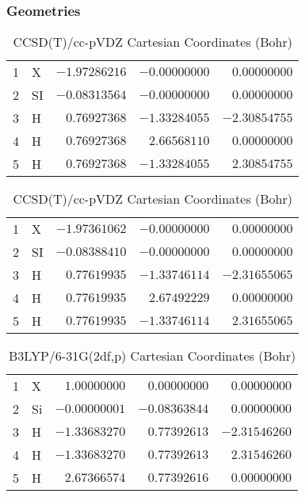 \documentclass[10pt,oneside]{article}
\begin{document}
\begin{table}[h!]
\subsubsection*{Geometries}
\begin{multicols}{2}
\centering
\caption{CCSD(T)/cc-pVTZ Cartesian Coordinates (Bohr)}
\begin{tabular}{llrrr}
\toprule
1  & X  & $-1.97286216$ & $-0.00000000$ & $ 0.00000000$ \\
2  & SI & $-0.08313564$ & $-0.00000000$ & $ 0.00000000$ \\
3  & H  & $ 0.76927368$ & $-1.33284055$ & $-2.30854755$ \\
4  & H  & $ 0.76927368$ & $ 2.66568110$ & $ 0.00000000$ \\
5  & H  & $ 0.76927368$ & $-1.33284055$ & $ 2.30854755$ \\
\bottomrule
\end{tabular}
\caption{CCSD(T)/cc-pVDZ Cartesian Coordinates (Bohr)}
\begin{tabular}{llrrr}
\toprule
1  & X  & $-1.97361062$ & $-0.00000000$ & $ 0.00000000$ \\
2  & SI & $-0.08388410$ & $-0.00000000$ & $ 0.00000000$ \\
3  & H  & $ 0.77619935$ & $-1.33746114$ & $-2.31655065$ \\
4  & H  & $ 0.77619935$ & $ 2.67492229$ & $ 0.00000000$ \\
5  & H  & $ 0.77619935$ & $-1.33746114$ & $ 2.31655065$ \\
\bottomrule
\end{tabular}
\end{multicols}
\end{table}

\begin{table}[h]
\centering
\caption{B3LYP/6-31G(2df,p) Cartesian Coordinates (Bohr)}
\begin{tabular}{llrrr}
\toprule
1  & X  & $ 1.00000000$ & $ 0.00000000$ & $ 0.00000000$ \\
2  & Si & $-0.00000001$ & $-0.08363844$ & $ 0.00000000$ \\
3  & H  & $-1.33683270$ & $ 0.77392613$ & $-2.31546260$ \\
4  & H  & $-1.33683270$ & $ 0.77392613$ & $ 2.31546260$ \\
5  & H  & $ 2.67366574$ & $ 0.77392616$ & $ 0.00000000$ \\
\bottomrule
\end{tabular}
\end{table}
\end{document}
